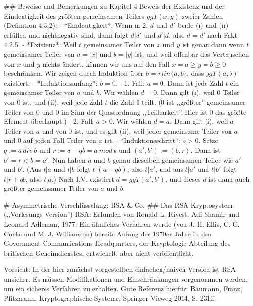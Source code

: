 \documentclass[a4paper]{article}
\begin{document}
\begin{multicols}{3}
{{{            ## Beweise und Bemerkungen zu Kapitel 4
            Beweis der Existenz und der Eindeutigkeit des größten gemeinsamen Teilers $ggT(x,y)$ zweier Zahlen (Definition 4.3.2):
            - *Eindeutigkeit*: Wenn in 2. $d$ und $d′$ beide (i) und (ii) erfüllen und nichtnegativ sind, dann folgt $d|d′$ und $d′|d$, also $d=d′$ nach Fakt 4.2.5.
            - *Existenz*: Weil $t$ gemeinsamer Teiler von $x$ und $y$ ist genau dann wenn $t$ gemeinsamer Teiler von $a=|x|$ und $b=|y|$ ist, und weil offenbar das Vertauschen von $x$ und $y$ nichts ändert, können wir uns auf den Fall $x=a\geq y=b\geq 0$ beschränken. Wir zeigen durch Induktion über $b=min\{a,b\}$, dass $ggT(a,b)$ existiert.
            - *Induktionsanfang*: $b=0$.
            - 1. Fall: $a= 0$. Dann ist jede Zahl $t$ ein gemeinsamer Teiler von $a$ und $b$. Wir wählen $d=0$. Dann gilt (i), weil $0$ Teiler von $0$ ist, und (ii), weil jede Zahl $t$ die Zahl $0$ teilt. ($0$ ist ,,größter'' gemeinsamer Teiler von 0 und 0 im Sinn der Quasiordnung ,,Teilbarkeit''. Hier ist 0 das größte Element überhaupt.)
            - 2. Fall: $a >0$. Wir wählen $d=a$. Dann gilt (i), weil $a$ Teiler von $a$ und von 0 ist, und es gilt (ii), weil jeder gemeinsame Teiler von $a$ und 0 auf jeden Fall Teiler von $a$ ist.
            - *Induktionsschritt*: $b>0$. Setze $q:=a\ div\ b$ und $r:=a-qb=a\ mod\ b$ und $(a′,b′):=(b,r)$. Dann ist $b′=r < b=a′$. Nun haben $a$ und $b$ genau dieselben gemeinsamen Teiler wie $a′$ und $b′$. (Aus $t|a$ und $t|b$ folgt $t|(a-qb)$, also $t|a′$, und aus $t|a′$ und $t|b′$ folgt $t|r+qb$, also $t|a$.) Nach I.V. existiert $d= ggT(a′,b′)$, und dieses $d$ ist dann auch größter gemeinsamer Teiler von $a$ und $b$.


            # Asymmetrische Verschlüsselung: RSA & Co.
            ## Das RSA-Kryptosystem (,,Vorlesungs-Version'')
            RSA: Erfunden von Ronald L. Rivest, Adi Shamir und Leonard Adleman, 1977. Ein ähnliches Verfahren wurde (von J. H. Ellis, C. C. Cocks und M. J. Williamson) bereits Anfang der 1970er Jahre in den Government Communications Headquarters, der Kryptologie-Abteilung des britischen Geheimdienstes, entwickelt, aber nicht veröffentlicht.

            Vorsicht: In der hier zunächst vorgestellten einfachen/naiven Version ist RSA unsicher. Es müssen Modifikationen und Einschränkungen vorgenommen werden, um ein
            sicheres Verfahren zu erhalten. Gute Referenz hierfür: Baumann, Franz, Pfitzmann, Kryptographische Systeme, Springer Vieweg 2014, S. 231ff.

}}}
\end{multicols}
\end{document}
